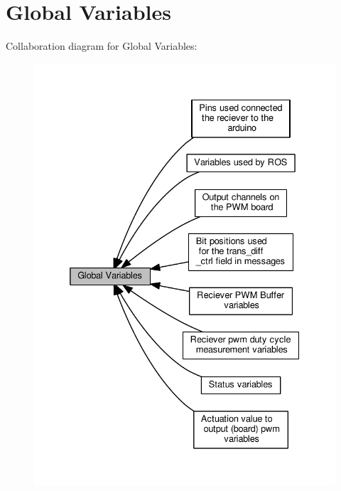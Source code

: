 \hypertarget{group__GlobalVariables}{}\section{Global Variables}
\label{group__GlobalVariables}
Collaboration diagram for Global Variables\+:\nopagebreak
\begin{figure}[H]
\begin{center}
\leavevmode
\includegraphics[width=332pt]{group__GlobalVariables}
\end{center}
\end{figure}

